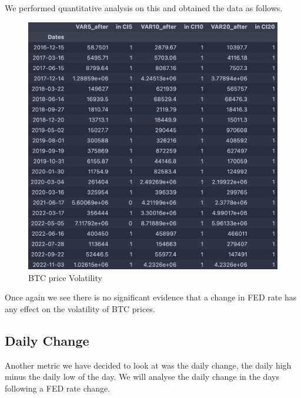 \documentclass[12pt]{article}
\begin{document}
\noindent We performed quantitative analysis on this and obtained the data as follows.

\begin{figure}[H]
   \includegraphics[scale=0.7]{research_project/text/paper/7.png}
   \centering
   \caption{BTC price Volatility}
   \label{fig:FED Rate evolution 2016 - 2022}
\end{figure}
Once again we see there is no significant evidence that a change in FED rate has any effect on the volatility of BTC prices.
\subsection{Daily Change}
Another metric we have decided to look at was the daily change, the daily high minus the daily low of the day. We will analyse the daily change in the days following a FED rate change.\\
\end{document}
